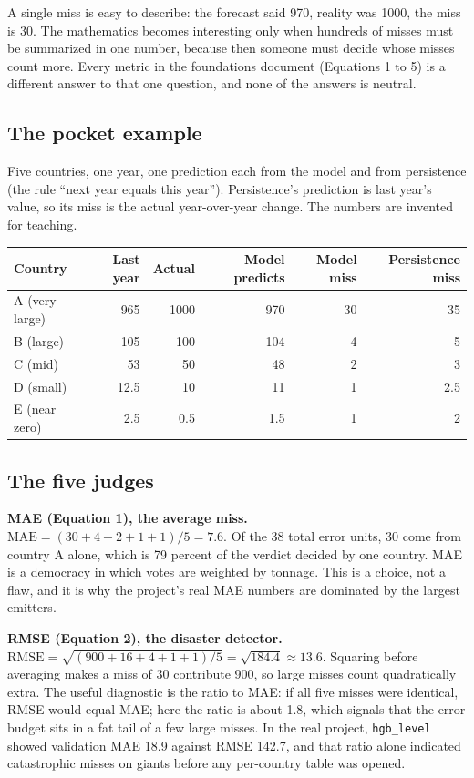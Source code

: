 \documentclass[11pt]{article}
\begin{document}
A single miss is easy to describe: the forecast said 970, reality was
1000, the miss is 30. The mathematics becomes interesting only when
hundreds of misses must be summarized in one number, because then someone
must decide whose misses count more. Every metric in the foundations
document (Equations 1 to 5) is a different answer to that one question,
and none of the answers is neutral.

\subsection{The pocket example}

Five countries, one year, one prediction each from the model and from
persistence (the rule ``next year equals this year''). Persistence's
prediction is last year's value, so its miss is the actual year-over-year
change. The numbers are invented for teaching.

\begin{center}
\begin{tabular}{lrrrrr}
\toprule
Country & Last year & Actual & Model predicts & Model miss & Persistence miss \\
\midrule
A (very large) & 965  & 1000 & 970  & 30 & 35 \\
B (large)      & 105  & 100  & 104  & 4  & 5 \\
C (mid)        & 53   & 50   & 48   & 2  & 3 \\
D (small)      & 12.5 & 10   & 11   & 1  & 2.5 \\
E (near zero)  & 2.5  & 0.5  & 1.5  & 1  & 2 \\
\bottomrule
\end{tabular}
\end{center}

\subsection{The five judges}

\textbf{MAE (Equation 1), the average miss.}
$\mathrm{MAE} = (30+4+2+1+1)/5 = 7.6$. Of the 38 total error units, 30
come from country A alone, which is 79 percent of the verdict decided by
one country. MAE is a democracy in which votes are weighted by tonnage.
This is a choice, not a flaw, and it is why the project's real MAE numbers
are dominated by the largest emitters.

\textbf{RMSE (Equation 2), the disaster detector.}
$\mathrm{RMSE} = \sqrt{(900+16+4+1+1)/5} = \sqrt{184.4} \approx 13.6$.
Squaring before averaging makes a miss of 30 contribute 900, so large
misses count quadratically extra. The useful diagnostic is the ratio to
MAE: if all five misses were identical, RMSE would equal MAE; here the
ratio is about 1.8, which signals that the error budget sits in a fat
tail of a few large misses. In the real project, \texttt{hgb\_level}
showed validation MAE 18.9 against RMSE 142.7, and that ratio alone
indicated catastrophic misses on giants before any per-country table was
opened.
\end{document}
